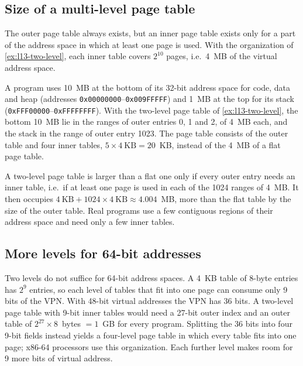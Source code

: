 \documentclass[../main.tex]{subfiles}
\begin{document}
\subsection{Size of a multi-level page table}

The outer page table always exists, but an inner page table exists only for a
part of the address space in which at least one page is used.  With the
organization of \cref{ex:l13-two-level}, each inner table covers $2^{10}$
pages, i.e.\ 4~MB of the virtual address space.

\begin{example}
  \label{ex:l13-two-level-size}
  A program uses 10~MB at the bottom of its 32-bit address space for code,
  data and heap (addresses \texttt{0x00000000}--\texttt{0x009FFFFF}) and 1~MB
  at the top for its stack (\texttt{0xFFF00000}--\texttt{0xFFFFFFFF}).  With
  the two-level page table of \cref{ex:l13-two-level}, the bottom 10~MB lie in
  the ranges of outer entries 0, 1 and 2, of 4~MB each, and the stack in the
  range of outer entry 1023.  The page table consists of the outer table and
  four inner tables, $5 \times 4~\text{KB} = 20$~KB, instead of the 4~MB of a
  flat page table.
\end{example}

A two-level page table is larger than a flat one only if every outer entry
needs an inner table, i.e.\ if at least one page is used in each of the 1024
ranges of 4~MB.  It then occupies
$4~\text{KB} + 1024 \times 4~\text{KB} \approx 4.004$~MB, more than the flat
table by the size of the outer table.  Real programs use a few contiguous
regions of their address space and need only a few inner tables.

\subsection{More levels for 64-bit addresses}

Two levels do not suffice for 64-bit address spaces.  A 4~KB table of 8-byte
entries has $2^{9}$ entries, so each level of tables that fit into one page
can consume only 9 bits of the VPN.  With 48-bit virtual addresses the VPN has
36 bits.  A two-level page table with 9-bit inner tables would need a 27-bit
outer index and an outer table of $2^{27} \times 8$~bytes $= 1$~GB for every
program.  Splitting the 36 bits into four 9-bit fields instead yields a
four-level page table in which every table fits into one page; x86-64
processors use this organization.  Each further level makes room for 9 more
bits of virtual address.
\end{document}
